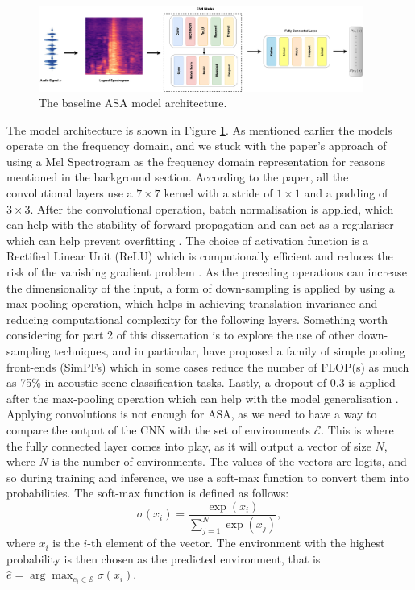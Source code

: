 \documentclass[logo,bsc,singlespacing,parskip,online]{infthesis}
\begin{document}
\begin{figure}[h]
   \centering
   \includegraphics[width=0.95\textwidth]{cnn-diagram2.png}
   \caption{The baseline ASA model architecture.}
   \label{fig:cnn-model-architecture}
\end{figure}
The model architecture is shown in Figure \ref{fig:cnn-model-architecture}. As 
mentioned earlier the models operate on the frequency domain, and 
we stuck with the paper's approach of using a Mel Spectrogram as the 
frequency domain representation for reasons mentioned in the background section. 
According to the paper, all the convolutional layers use a $7 \times 7$ kernel
with a stride of $1 \times 1$ and a padding of $3 \times 3$. After the convolutional operation, 
batch normalisation is applied, which can help with the stability of forward propagation 
and can act as a regulariser which can help prevent overfitting \citep{prince2023understanding}.
The choice of activation function is a Rectified Linear Unit (ReLU) which is computionally 
efficient and reduces the risk of the vanishing gradient problem \citep{prince2023understanding}.
As the preceding operations can increase the dimensionality of the input, a form of down-sampling is applied by using a max-pooling operation, which helps in achieving 
translation invariance and reducing computational complexity for the following layers. Something worth considering for 
part 2 of this dissertation is to explore the use of other down-sampling techniques, and in particular,
\citet{liu_simple_2023} have proposed a family of simple pooling front-ends (SimPFs) 
which in some cases reduce the number of FLOP(s) as much as 75\% in acoustic scene classification tasks. 
Lastly, a dropout of 0.3 is applied after the max-pooling operation which can help with 
the model generalisation \citep{prince2023understanding}.
Applying convolutions is not enough for ASA, 
as we need to have a way to compare the output of the CNN with the set of environments \(\mathcal{E}\).
This is where the fully connected layer comes into play, as it will output a vector of size \(N\), where \(N\) is the number of environments.
The values of the vectors are logits, and so during training and inference, we use a soft-max function to convert them into probabilities.
The soft-max function is defined as follows:
\[
\sigma(x_i) = \frac{\exp(x_i)}{\sum_{j=1}^{N} \exp(x_j)},
\]
where \(x_i\) is the \(i\)-th element of the vector.
The environment with the highest probability is then chosen as the predicted environment, 
that is \(\hat{e} = \arg\max_{e_i \in \mathcal{E}} \sigma(x_i)\).
\end{document}
